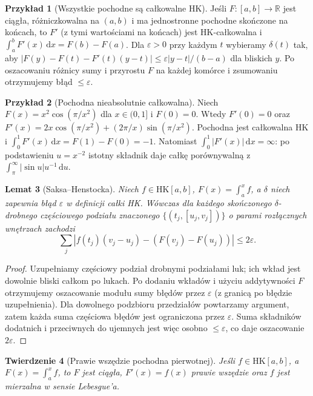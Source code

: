 \documentclass[11pt,a4paper]{article}
\numberwithin{equation}{section}
\theoremstyle{plain}
\newtheorem{twierdzenie}{Twierdzenie}[section]
\newtheorem{lemat}[twierdzenie]{Lemat}
\theoremstyle{definition}
\newtheorem{przyklad}[twierdzenie]{Przykład}
\theoremstyle{remark}
\newcommand{\R}{\mathbb R}
\newcommand{\HK}{\mathrm{HK}}
\begin{document}
\begin{przyklad}[Wszystkie pochodne są całkowalne HK]
Jeśli $F:[a,b]\to\R$ jest ciągła, różniczkowalna na $(a,b)$ i ma jednostronne pochodne skończone na końcach, to $F'$ (z tymi wartościami na końcach) jest HK-całkowalna i $\int_a^bF'(x)\,\mathrm dx=F(b)-F(a)$. Dla $\varepsilon>0$ przy każdym $t$ wybieramy $\delta(t)$ tak, aby $|F(y)-F(t)-F'(t)(y-t)|\le\varepsilon|y-t|/(b-a)$ dla bliskich $y$. Po oszacowaniu różnicy sumy i przyrostu $F$ na każdej komórce i zsumowaniu otrzymujemy błąd $\le\varepsilon$.
\end{przyklad}
\begin{przyklad}[Pochodna nieabsolutnie całkowalna]
Niech $F(x)=x^2\cos(\pi/x^2)$ dla $x\in(0,1]$ i $F(0)=0$. Wtedy $F'(0)=0$ oraz $F'(x)=2x\cos(\pi/x^2)+(2\pi/x)\sin(\pi/x^2)$. Pochodna jest całkowalna HK i $\int_0^1F'(x)\,\mathrm dx=F(1)-F(0)=-1$. Natomiast $\int_0^1|F'(x)|\,\mathrm dx=\infty$: po podstawieniu $u=x^{-2}$ istotny składnik daje całkę porównywalną z $\int_\pi^\infty |\sin u|u^{-1}\,\mathrm du$.
\end{przyklad}
\begin{lemat}[Saksa--Henstocka]
Niech $f\in\HK[a,b]$, $F(x)=\int_a^x f$, a $\delta$ niech zapewnia błąd $\varepsilon$ w definicji całki HK. Wówczas dla każdego skończonego $\delta$-drobnego \emph{częściowego} podziału znaczonego $\{(t_j,[u_j,v_j])\}$ o parami rozłącznych wnętrzach zachodzi
\[
\sum_j\left|f(t_j)(v_j-u_j)-(F(v_j)-F(u_j))\right|\le2\varepsilon.
\]
\end{lemat}
\begin{proof}
Uzupełniamy częściowy podział drobnymi podziałami luk; ich wkład jest dowolnie bliski całkom po lukach. Po dodaniu wkładów i użyciu addytywności $F$ otrzymujemy oszacowanie modułu sumy błędów przez $\varepsilon$ (z granicą po błędzie uzupełnienia). Dla dowolnego podzbioru przedziałów powtarzamy argument, zatem każda suma częściowa błędów jest ograniczona przez $\varepsilon$. Suma składników dodatnich i przeciwnych do ujemnych jest więc osobno $\le\varepsilon$, co daje oszacowanie $2\varepsilon$.
\end{proof}
\begin{twierdzenie}[Prawie wszędzie pochodna pierwotnej]
Jeśli $f\in\HK[a,b]$, a $F(x)=\int_a^x f$, to $F$ jest ciągła, $F'(x)=f(x)$ prawie wszędzie oraz $f$ jest mierzalna w sensie Lebesgue'a.
\end{twierdzenie}
\end{document}

